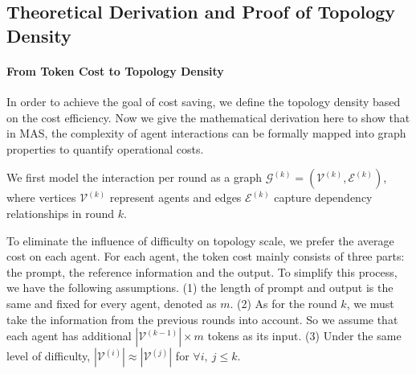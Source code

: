 \documentclass{article}
\theoremstyle{definition}
\begin{document}
\subsection{Theoretical Derivation and Proof of Topology Density}
\label{appendix:density}

\paragraph{From Token Cost to Topology Density} 
In order to achieve the goal of cost saving, we define the topology density based on the cost efficiency. Now we give the mathematical derivation here to show that in MAS, the complexity of agent interactions can be formally mapped into graph properties to quantify operational costs.

We first model the interaction per round as a graph \( \mathcal{G}^{(k)} = (\mathcal{V}^{(k)}, \mathcal{E}^{(k)}) \), where vertices \( \mathcal{V}^{(k)} \) represent agents and edges \( \mathcal{E}^{(k)} \) capture dependency relationships in round $k$. 

To eliminate the influence of difficulty on topology scale, we prefer the average cost on each agent. For each agent, the token cost mainly consists of three parts: the prompt, the reference information and the output. To simplify this process, we have the following assumptions. 
(1) the length of prompt and output is the same and fixed for every agent, denoted as $m$. 
(2) As for the round $k$, we must take the information from the previous rounds into account. So we assume that each agent has additional $|\mathcal{V}^{(k-1)}| \times m$ tokens as its input. 
(3) Under the same level of difficulty, $|\mathcal{V}^{(i)}| \approx |\mathcal{V}^{(j)}|$ for $\forall i,\ j \leq k$.
\end{document}
